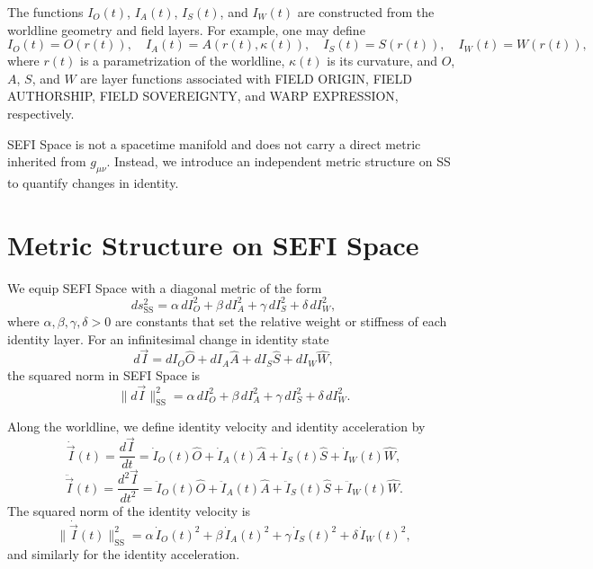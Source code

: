 \documentclass[12pt]{article}
\begin{document}
The functions $I_O(t)$, $I_A(t)$, $I_S(t)$, and $I_W(t)$ are constructed from the worldline geometry and
field layers. For example, one may define
\begin{equation}
I_O(t) = O(r(t)), \quad I_A(t) = A(r(t), \kappa(t)), \quad I_S(t) = S(r(t)), \quad I_W(t) = W(r(t)),
\end{equation}
where $r(t)$ is a parametrization of the worldline, $\kappa(t)$ is its curvature, and $O$, $A$, $S$, and $W$
are layer functions associated with FIELD ORIGIN, FIELD AUTHORSHIP, FIELD SOVEREIGNTY, and WARP EXPRESSION,
respectively.

SEFI Space is not a spacetime manifold and does not carry a direct metric inherited from $g_{\mu\nu}$. Instead,
we introduce an independent metric structure on SS to quantify changes in identity.

\section{Metric Structure on SEFI Space}

We equip SEFI Space with a diagonal metric of the form
\begin{equation}
ds_{\text{SS}}^2 = \alpha \, dI_O^2 + \beta \, dI_A^2 + \gamma \, dI_S^2 + \delta \, dI_W^2,
\end{equation}
where $\alpha, \beta, \gamma, \delta > 0$ are constants that set the relative weight or stiffness of each
identity layer. For an infinitesimal change in identity state
\begin{equation}
d\vec{I} = dI_O \hat{O} + dI_A \hat{A} + dI_S \hat{S} + dI_W \hat{W},
\end{equation}
the squared norm in SEFI Space is
\begin{equation}
\|d\vec{I}\|_{\text{SS}}^2 = \alpha \, dI_O^2 + \beta \, dI_A^2 + \gamma \, dI_S^2 + \delta \, dI_W^2.
\end{equation}

Along the worldline, we define identity velocity and identity acceleration by
\begin{equation}
\dot{\vec{I}}(t) = \frac{d\vec{I}}{dt} = \dot{I}_O(t) \hat{O} + \dot{I}_A(t) \hat{A} + \dot{I}_S(t) \hat{S} + \dot{I}_W(t) \hat{W},
\end{equation}
\begin{equation}
\ddot{\vec{I}}(t) = \frac{d^2\vec{I}}{dt^2} = \ddot{I}_O(t) \hat{O} + \ddot{I}_A(t) \hat{A} + \ddot{I}_S(t) \hat{S} + \ddot{I}_W(t) \hat{W}.
\end{equation}
The squared norm of the identity velocity is
\begin{equation}
\|\dot{\vec{I}}(t)\|_{\text{SS}}^2 = \alpha \, \dot{I}_O(t)^2 + \beta \, \dot{I}_A(t)^2 + \gamma \, \dot{I}_S(t)^2 + \delta \, \dot{I}_W(t)^2,
\end{equation}
and similarly for the identity acceleration.
\end{document}
